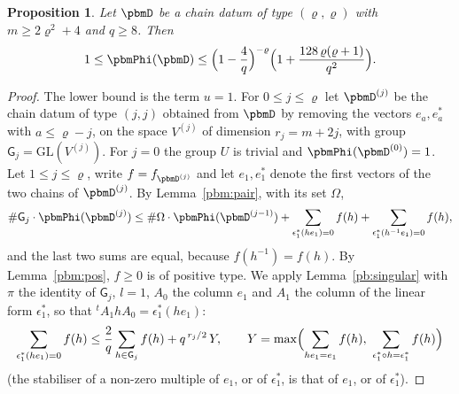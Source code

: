 \documentclass[10pt]{amsart}
\newtheorem{proposition}[theorem]{Proposition}
\theoremstyle{definition}
\theoremstyle{remark}
\providecommand{\auGL}{\mathrm{GL}}
\begin{document}
\begin{proposition}\label{pbm:Phi}
Let $\pbmD$ be a chain datum of type $(\varrho,\varrho)$ with $m\ge2\varrho^2+4$ and $q\ge8$. Then
\[
1\le\pbmPhi(\pbmD)\le\Bigl(1-\frac4q\Bigr)^{-\varrho}\Bigl(1+\frac{128\,\varrho(\varrho+1)}{q^2}\Bigr).
\]
\end{proposition}
\begin{proof}
The lower bound is the term $u=1$. For $0\le j\le\varrho$ let $\pbmD^{(j)}$ be the chain datum of
type $(j,j)$ obtained from $\pbmD$ by removing the vectors $e_a,e_a^*$ with $a\le\varrho-j$, on the
space $V^{(j)}$ of dimension $r_j=m+2j$, with group $\mathsf G_j=\auGL(V^{(j)})$. For $j=0$ the
group $U$ is trivial and $\pbmPhi(\pbmD^{(0)})=1$. Let $1\le j\le\varrho$, write $f=f_{\pbmD^{(j)}}$ and
let $e_1,e_1^*$ denote the first vectors of the two chains of $\pbmD^{(j)}$. By
Lemma~\ref{pbm:pair}, with its set $\Omega$,
\begin{equation}\label{pbm:eq-rec}
\#\mathsf G_j\cdot\pbmPhi(\pbmD^{(j)})\le\#\Omega\cdot\pbmPhi(\pbmD^{(j-1)})+\sum_{\epsilon_1^*(he_1)=0}f(h)
+\sum_{\epsilon_1^*(h^{-1}e_1)=0}f(h),
\end{equation}
and the last two sums are equal, because $f(h^{-1})=f(h)$. By Lemma~\ref{pbm:pos}, $f\ge0$ is of
positive type. We apply Lemma~\ref{pb:singular} with $\pi$ the identity of $\mathsf G_j$, $l=1$,
$A_0$ the column $e_1$ and $A_1$ the column of the linear form $\epsilon_1^*$, so that
${}^tA_1hA_0=\epsilon_1^*(he_1)$:
\begin{equation}\label{pbm:eq-fourier}
\sum_{\epsilon_1^*(he_1)=0}f(h)\le\frac2q\sum_{h\in\mathsf G_j}f(h)+q^{\,r_j/2}\,Y,\qquad
Y=\max\Bigl(\sum_{he_1=e_1}f(h),\ \sum_{\epsilon_1^*\circ h=\epsilon_1^*}f(h)\Bigr)
\end{equation}
(the stabiliser of a non-zero multiple of $e_1$, or of $\epsilon_1^*$, is that of $e_1$, or of
$\epsilon_1^*$).


\end{proof}
\end{document}
